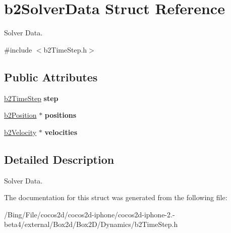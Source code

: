 \hypertarget{structb2_solver_data}{\section{b2\-Solver\-Data Struct Reference}
\label{structb2_solver_data}
}


Solver Data.  




{\ttfamily \#include $<$b2\-Time\-Step.\-h$>$}

\subsection*{Public Attributes}
\begin{DoxyCompactItemize}
\item 
\hypertarget{structb2_solver_data_a99998296de1b4f128c396def56392eea}{\hyperlink{structb2_time_step}{b2\-Time\-Step} {\bfseries step}}\label{structb2_solver_data_a99998296de1b4f128c396def56392eea}

\item 
\hypertarget{structb2_solver_data_a5eb6ee68b42d96164579a4a0df8be04b}{\hyperlink{structb2_position}{b2\-Position} $\ast$ {\bfseries positions}}\label{structb2_solver_data_a5eb6ee68b42d96164579a4a0df8be04b}

\item 
\hypertarget{structb2_solver_data_a1072627a3e962a8bc7088657a512191c}{\hyperlink{structb2_velocity}{b2\-Velocity} $\ast$ {\bfseries velocities}}\label{structb2_solver_data_a1072627a3e962a8bc7088657a512191c}

\end{DoxyCompactItemize}


\subsection{Detailed Description}
Solver Data. 

The documentation for this struct was generated from the following file\-:\begin{DoxyCompactItemize}
\item 
/\-Bing/\-File/cocos2d/cocos2d-\/iphone/cocos2d-\/iphone-\/2.-\/beta4/external/\-Box2d/\-Box2\-D/\-Dynamics/b2\-Time\-Step.\-h\end{DoxyCompactItemize}
